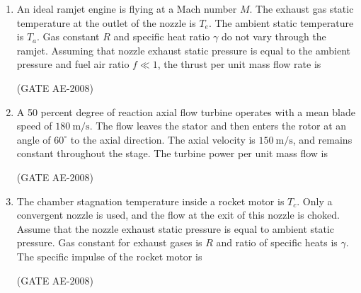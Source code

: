 \documentclass[journal,12pt,onecolumn]{IEEEtran}
\theoremstyle{remark}
\begin{document}
\begin{enumerate}
\item  An ideal ramjet engine is flying at a Mach number $M$. The exhaust gas static temperature at the outlet of the nozzle is $T_e$. The ambient static temperature is $T_a$. Gas constant $R$ and specific heat ratio $\gamma$ do not vary through the ramjet. Assuming that nozzle exhaust static pressure is equal to the ambient pressure and fuel air ratio $f \ll 1$, the thrust per unit mass flow rate is  
\begin{enumerate}
\end{enumerate}
 \hfill(GATE AE-2008)

    \quad

\item A 50 percent degree of reaction axial flow turbine operates with a mean blade speed of $180 \ \mathrm{m/s}$. The flow leaves the stator and then enters the rotor at an angle of $60^\circ$ to the axial direction. The axial velocity is $150 \ \mathrm{m/s}$, and remains constant throughout the stage. The turbine power per unit mass flow is  
\begin{enumerate}
\end{enumerate}
\hfill(GATE AE-2008)

    \quad

\item The chamber stagnation temperature inside a rocket motor is $T_c$. Only a convergent nozzle is used, and the flow at the exit of this nozzle is choked. Assume that the nozzle exhaust static pressure is equal to ambient static pressure. Gas constant for exhaust gases is $R$ and ratio of specific heats is $\gamma$. The specific impulse of the rocket motor is  
\begin{enumerate}
\end{enumerate}
\hfill(GATE AE-2008)


\end{enumerate}
\end{document}
